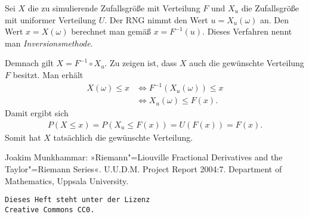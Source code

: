 \documentclass[a4paper,10pt,fleqn,twocolumn,twoside]{scrartcl}
\numberwithin{equation}{section}
\theoremstyle{rmbox}
\begin{document}
Sei $X$ die zu simulierende Zufallsgröße mit Verteilung $F$
und $X_u$ die Zufallsgröße mit uniformer Verteilung $U$. Der RNG
nimmt den Wert $u=X_u(\omega)$ an. Den Wert $x=X(\omega)$ berechnet
man gemäß $x=F^{-1}(u)$. Dieses Verfahren nennt man
\emph{Inversionsmethode}.

Demnach gilt $X=F^{-1}\circ X_u$. Zu zeigen ist, dass $X$ auch
die gewünschte Verteilung $F$ besitzt. Man erhält
\begin{align}
X(\omega)\le x&\iff F^{-1}(X_u(\omega))\le x\\
&\iff X_u(\omega)\le F(x).
\end{align}
Damit ergibt sich
\begin{gather}
P(X\le x) = P(X_u\le F(x)) = U(F(x)) = F(x).
\end{gather}
Somit hat $X$ tatsächlich die gewünschte Verteilung.


\newpage
\begin{thebibliography}{x}
\bibitem{} Joakim Munkhammar: »Riemann"=Liouville Fractional Derivatives
and the Taylor"=Riemann Series«. U.U.D.M. Project Report 2004:7.
Department of Mathematics, Uppsala University.
\end{thebibliography}

\vfill\noindent
\texttt{Dieses Heft steht unter der Lizenz\\
Creative Commons CC0.}
\end{document}
